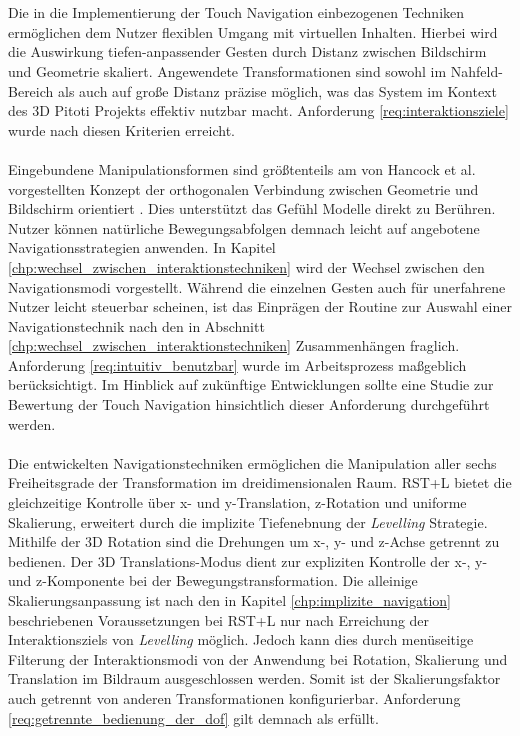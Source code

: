 \\\\
Die in die Implementierung der Touch Navigation einbezogenen Techniken ermöglichen dem Nutzer flexiblen Umgang mit virtuellen Inhalten. Hierbei wird die Auswirkung tiefen-anpassender Gesten durch Distanz zwischen Bildschirm und Geometrie skaliert. Angewendete Transformationen sind sowohl im Nahfeld-Bereich als auch auf große Distanz präzise möglich, was das System im Kontext des 3D Pitoti Projekts effektiv nutzbar macht. Anforderung \ref{req:interaktionsziele} wurde nach diesen Kriterien erreicht.
\\\\
Eingebundene Manipulationsformen sind größtenteils am von Hancock et al. vorgestellten Konzept der orthogonalen Verbindung zwischen Geometrie und Bildschirm orientiert \cite{hancock:2007,hancock:2009}. \newline Dies unterstützt das Gefühl Modelle direkt zu Berühren. Nutzer können natürliche Bewegungsabfolgen demnach leicht auf angebotene Navigationsstrategien anwenden. In Kapitel \ref{chp:wechsel_zwischen_interaktionstechniken} wird der Wechsel zwischen den Navigationsmodi vorgestellt. Während die einzelnen Gesten auch für unerfahrene Nutzer leicht steuerbar scheinen, ist das Einprägen der Routine zur Auswahl einer Navigationstechnik nach den in Abschnitt \ref{chp:wechsel_zwischen_interaktionstechniken} Zusammenhängen fraglich. Anforderung \ref{req:intuitiv_benutzbar} wurde im Arbeitsprozess maßgeblich berücksichtigt. Im Hinblick auf zukünftige Entwicklungen sollte eine Studie zur Bewertung der Touch Navigation hinsichtlich dieser Anforderung durchgeführt werden. 
\\\\
Die entwickelten Navigationstechniken ermöglichen die Manipulation aller sechs Freiheitsgrade der Transformation im dreidimensionalen Raum. RST+L bietet die gleichzeitige Kontrolle über x- und y-Translation, z-Rotation und uniforme Skalierung, erweitert durch die implizite Tiefenebnung der \emph{Levelling} Strategie. Mithilfe der 3D Rotation sind die Drehungen um x-, y- und z-Achse getrennt zu bedienen. Der 3D Translations-Modus dient zur expliziten Kontrolle der x-, y- und z-Komponente bei der Bewegungstransformation. Die alleinige Skalierungsanpassung ist nach den in Kapitel \ref{chp:implizite_navigation} beschriebenen Voraussetzungen bei RST+L nur nach Erreichung der Interaktionsziels von \emph{Levelling} möglich. Jedoch kann dies durch menüseitige Filterung der Interaktionsmodi von der Anwendung bei Rotation, Skalierung und Translation im Bildraum ausgeschlossen werden. Somit ist der Skalierungsfaktor auch getrennt von anderen Transformationen konfigurierbar. Anforderung \ref{req:getrennte_bedienung_der_dof} gilt demnach als erfüllt.
